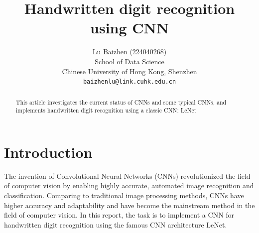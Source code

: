 \documentclass{article}
\title{
  Handwritten digit recognition using CNN\\
  \vspace{1em}
}
\author{
  Lu Baizhen (224040268) \\
  School of Data Science \\
  Chinese University of Hong Kong, Shenzhen \\
  \texttt{baizhenlu@link.cuhk.edu.cn} \\
}
\begin{document}
\maketitle

\begin{abstract}
  This article investigates the current status of CNNs and some typical CNNs, 
  and implements handwritten digit recognition using a classic CNN: LeNet
\end{abstract}



\section{Introduction}
The invention of Convolutional Neural Networks (CNNs) revolutionized the field of computer vision by enabling highly accurate, automated image recognition and classification. 
Comparing to traditional image processing methods, CNNs have higher accuracy and adaptability and have become the mainstream method in the field of computer vision.
In this report, the task is to implement a CNN for handwritten digit recognition using the famous CNN architecture LeNet.
\end{document}

